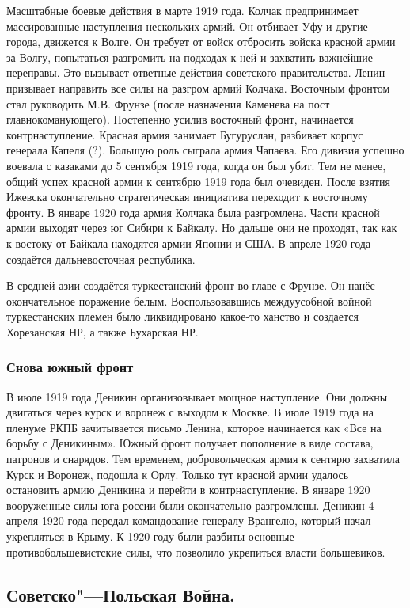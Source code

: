 Масштабные боевые действия в марте 1919 года. Колчак предпринимает массированные наступления нескольких армий. Он отбивает Уфу и другие города, движется к Волге. Он требует от войск отбросить войска красной армии за Волгу, попытаться разгромить на подходах к ней и захватить важнейшие переправы. Это вызывает ответные действия советского правительства. Ленин призывает направить все силы на разгром армий Колчака. Восточным фронтом стал руководить М.В. Фрунзе (после назначения Каменева на пост главнокоманующего). Постепенно усилив восточный фронт, начинается контрнаступление. Красная армия занимает Бугуруслан, разбивает корпус генерала Капеля (?). Большую роль сыграла армия Чапаева. Его дивизия успешно воевала с казаками до 5 сентября 1919 года, когда он был убит.
Тем не менее, общий успех красной армии к сентябрю 1919 года был очевиден. После взятия Ижевска окончательно стратегическая инициатива переходит к восточному фронту.
В январе 1920 года армия Колчака была разгромлена. Части красной армии выходят через юг Сибири к Байкалу. Но дальше они не проходят, так как к востоку от Байкала находятся армии Японии и США. В апреле 1920 года создаётся дальневосточная республика.

В средней азии создаётся туркестанский фронт во главе с Фрунзе. Он нанёс окончательное поражение белым. Воспользовавшись междуусобной войной туркестанских племен было ликвидировано какое-то ханство и создается Хорезанская НР, а также Бухарская НР.

\subsubsection{Снова южный фронт}

В июле 1919 года Деникин организовывает мощное наступление. Они должны двигаться через курск и воронеж с выходом к Москве. В июле 1919 года на пленуме РКПБ зачитывается письмо Ленина, которое начинается как «Все на борьбу с Деникиным». Южный фронт получает пополнение в виде состава, патронов и снарядов. Тем временем, добровольческая армия к сентярю захватила Курск и Воронеж, подошла к Орлу. Только тут красной армии удалось остановить армию Деникина и перейти в контрнаступление. В январе 1920 вооруженные силы юга россии были окончательно разгромлены. Деникин 4 апреля 1920 года передал командование генералу Врангелю, который начал укрепляться в Крыму.
К 1920 году были разбиты основные противобольшевистские силы, что позволило укрепиться власти большевиков.

\subsection{Советско"---Польская Война.}

